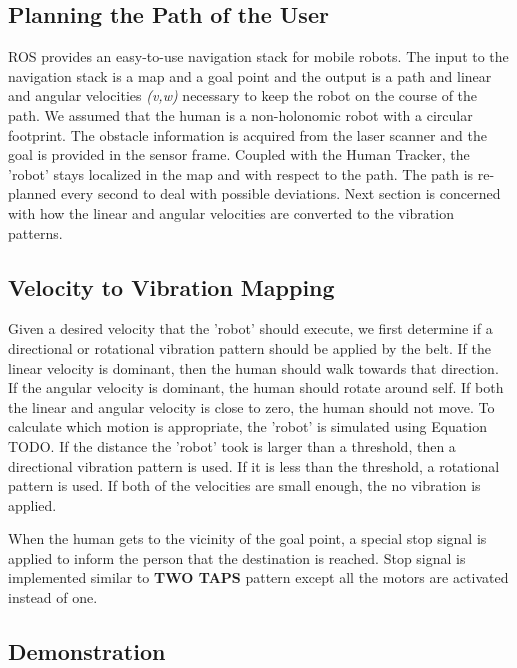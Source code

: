 \documentclass[12pt]{gatech-thesis}
\begin{document}
\subsection{Planning the Path of the User}

ROS provides an easy-to-use navigation stack for mobile robots. The input to the navigation stack is a map and a goal point and the output is a path and linear and angular velocities \emph{(v,w)} necessary to keep the robot on the course of the path. We assumed that the human is a non-holonomic robot with a circular footprint. The obstacle information is acquired from the laser scanner and the goal is provided in the sensor frame. Coupled with the Human Tracker, the 'robot' stays localized in the map and with respect to the path. The path is re-planned every second to deal with possible deviations. Next section is concerned with how the linear and angular velocities are converted to the vibration patterns.

\subsection{Velocity to Vibration Mapping}


Given a desired velocity that the 'robot' should execute, we first determine if a directional or rotational vibration pattern should be applied by the belt. If the linear velocity is dominant, then the human should walk towards that direction. If the angular velocity is dominant, the human should rotate around self. If both the linear and angular velocity is close to zero, the human should not move. To calculate which motion is appropriate, the 'robot' is simulated using Equation TODO. If the distance the 'robot' took is larger than a threshold, then a directional vibration pattern is used. If it is less than the threshold, a rotational pattern is used. If both of the velocities are small enough, the no vibration is applied. 

When the human gets to the vicinity of the goal point, a special stop signal is applied to inform the person that the destination is reached. Stop signal is implemented similar to \textbf{TWO TAPS} pattern except all the motors are activated instead of one.

\subsection{Demonstration}
\end{document}
